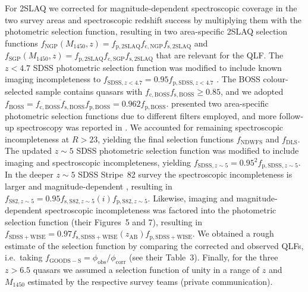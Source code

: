 \documentclass[fleqn,usenatbib]{mnras}
\begin{document}
For 2SLAQ we corrected for magnitude-dependent spectroscopic coverage
in the two survey areas \citep[$f_\mathrm{c,NGP}\left(g\right)$ and
  $f_\mathrm{c,SGP}\left(g\right)$; Figure~4
  in][]{2009MNRAS.392...19C} and spectroscopic redshift success
\citep[$f_\mathrm{s,2SLAQ}\left(g\right)$; Figure~6b
  in][]{2009MNRAS.392...19C} by multiplying them with the photometric
selection function, resulting in two area-specific 2SLAQ selection
functions
$f_\mathrm{NGP}\left(M_{1450},z\right)=f_\mathrm{p,2SLAQ}f_\mathrm{c,NGP}f_\mathrm{s,2SLAQ}$
and
$f_\mathrm{SGP}\left(M_{1450},z\right)=f_\mathrm{p,2SLAQ}f_\mathrm{c,SGP}f_\mathrm{s,2SLAQ}$
that are relevant for the QLF.  The $z<4.7$ SDSS photometric selection
function was modified to include known imaging incompleteness to
$f_{\mathrm{SDSS},z<4.7}=0.95f_{\mathrm{p,SDSS},z<4.7}$
\citep{2006AJ....131.2766R}. The BOSS colour-selected sample
\citep{2013ApJ...773...14R} contains quasars with
$f_\mathrm{c,BOSS}f_\mathrm{s,BOSS}\ge 0.85$, and we adopted
$f_\mathrm{BOSS}=\overline{f_\mathrm{c,BOSS}f_\mathrm{s,BOSS}}
f_\mathrm{p,BOSS}=0.962f_\mathrm{p,BOSS}$. \citet{2010ApJ...710.1498G}
presented two area-specific photometric selection functions due to
different filters employed, and more follow-up spectroscopy was
reported in \citet{2011ApJ...728L..26G}. We accounted for remaining
spectroscopic incompleteness at $R>23$, yielding the final selection
functions $f_\mathrm{NDWFS}$ and $f_\mathrm{DLS}$. The updated $z\sim
5$ SDSS photometric selection function \citep{2013ApJ...768..105M} was
modified to include imaging and spectroscopic incompleteness, yielding
$f_{\mathrm{SDSS},z\sim 5}=0.95^2f_{\mathrm{p,SDSS},z\sim 5}$. In the
deeper $z\sim 5$ SDSS Stripe~82 survey the spectroscopic
incompleteness is larger and magnitude-dependent \citep[Figure~14
  in][]{2013ApJ...768..105M}, resulting in $f_{\mathrm{S82},z\sim
  5}=0.95f_{\mathrm{s,S82},z\sim
  5}\left(i\right)f_{\mathrm{p,S82},z\sim 5}$. Likewise, imaging and
magnitude-dependent spectroscopic incompleteness was factored into the
\citet{2016ApJ...829...33Y} photometric selection function (their
Figures~5 and 7), resulting in
$f_\mathrm{SDSS+WISE}=0.97f_\mathrm{s,SDSS+WISE}
\left(z_\mathrm{AB}\right)f_\mathrm{p,SDSS+WISE}$.  We obtained a
rough estimate of the \citet{2015AA...578A..83G} selection function by
comparing the corrected and observed QLFs, i.e.\ taking
$f_\mathrm{GOODS-S}=\phi_\mathrm{obs}/\phi_\mathrm{corr}$ (see their
Table~3).  Finally, for the three $z>6.5$ quasars we assumed a
selection function of unity in a range of $z$ and $M_{1450}$ estimated
by the respective survey teams (private communication).
\end{document}
